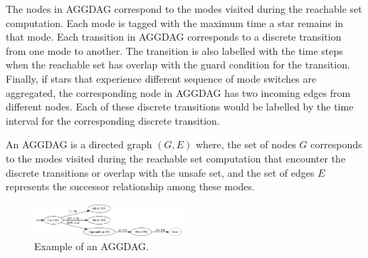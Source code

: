 
The nodes in AGGDAG correspond to the modes visited during the reachable set computation. Each mode is tagged with the maximum time a star remains in that mode. Each transition in AGGDAG corresponds to a discrete transition from one mode to another. The transition is also labelled with the time steps when the reachable set has overlap with the guard condition for the transition. Finally, if stars that experience different sequence of mode switches are aggregated, the corresponding node in AGGDAG has two incoming edges from different nodes. Each of these discrete transitions would be labelled by the time interval for the corresponding discrete transition.

\begin{definition}
\label{def:aggdag}
An AGGDAG is a directed graph $(G, E)$ where, the set of nodes $G$ corresponds to the modes visited during the reachable set computation that encounter the discrete transitions or overlap with the unsafe set, and the set of edges $E$ represents the successor relationship among these modes.
\end{definition}

\begin{figure}[t]
\centering
\includegraphics[width=0.49\textwidth]{images/viz2}
\caption{Example of an AGGDAG.}
\label{fig:aggdagex1}
\end{figure}


